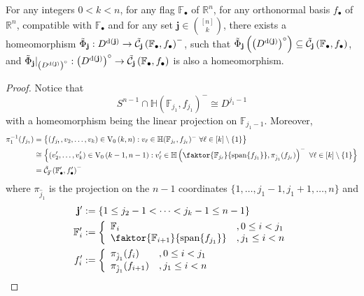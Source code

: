\begin{lemma}\label{lem:shub_dim} For any integers $0<k<n$, for any flag $\mathbb{F}_{\bullet}$ of $\mathbb{R}^n$, for any orthonormal basis $f_{\bullet}$ of $\mathbb{R}^n$, compatible with $\mathbb{F}_{\bullet}$ and for any set $\mathbf{j}\in\binom{[n]}{k}$, there exists a homeomorphism
$\tilde{\Phi}_{\mathbf{j}}:D^{\mathrm{d}(\mathbf{j})}\to\tilde{\mathcal{C}}_{\mathbf{j}}\left(\mathbb{F}_{\bullet},f_{\bullet}\right)^-$,
such that $\tilde{\Phi}_{\mathbf{j}}\left({\left(D^{\mathrm{d}(\mathbf{j})}\right)}^{\circ}\right)\subseteq\tilde{\mathcal{C}}_{\mathbf{j}}\left(\mathbb{F}_{\bullet},f_{\bullet}\right)$, and
$\tilde{\Phi}_{\mathbf{j}}|_{{\left(D^{\mathrm{d}(\mathbf{j})}\right)}^{\circ}}:{\left(D^{\mathrm{d}(\mathbf{j})}\right)}^{\circ}\to\tilde{\mathcal{C}}_{\mathbf{j}}\left(\mathbb{F}_{\bullet},f_{\bullet}\right)$
is also a homeomorphism.
\end{lemma}
\begin{proof}
Notice that
\begin{equation}\label{eq:linear_proj_disc}
S^{n-1}\cap\mathbb{H}{\left(\mathbb{F}_{j_1},f_{j_1}\right)}^-\cong D^{j_1-1}
\end{equation}
with a homeomorphism being the linear projection on $\mathbb{F}_{j_1-1}$. Moreover,
\begin{align}
\begin{split}
\pi_1^{-1}(f_{j_1})&=\big\{(f_{j_1},v_2,\ldots,v_k)\in\StO{k}{n}:v_{\ell}\in\mathbb{H}(\mathbb{F}_{j_{\ell}},f_{j_{\ell}})^-\ \forall\ell\in[k]\setminus\{1\}\big\}\\
&\cong\Big\{(v'_2,\ldots,v'_k)\in\StO{k-1}{n-1}
:v'_{\ell}\in\mathbb{H}\left(\faktor{\mathbb{F}_{j_{\ell}}}{\spans\{f_{j_1}\}},\pi_{\hat{j}_1}(f_{j_{\ell}})\right)^-\ \forall\ell\in[k]\setminus\{1\}\Big\}\\
&=\tilde{\mathcal{C}}_{\mathbf{j}'}{\left(\mathbb{F}'_{\bullet},f'_{\bullet}\right)}^-
\end{split}\label{eq:induction_step}
\end{align}
where $\pi_{\hat{j}_1}$ is the projection on the $n-1$ coordinates $\{1,\ldots,j_1-1,j_1+1,\ldots,n\}$ and
\begin{align*}
\mathbf{j}'&:=\{1\leq j_2-1<\cdots<j_k-1\leq n-1\}\\
\mathbb{F}'_i&:=\left\{\begin{array}{ll}\mathbb{F}_i&,0\leq i<j_1\\\faktor{\mathbb{F}_{i+1}}{\spans\{f_{j_1}\}}&,j_1\leq i<n\end{array}\right.\\
f'_i&:=\left\{\begin{array}{ll}\pi_{\hat{j}_1}(f_i)&,0\leq i<j_1\\\pi_{\hat{j}_1}(f_{i+1})&,j_1\leq i<n\end{array}\right.

\end{align*}
\end{proof}
